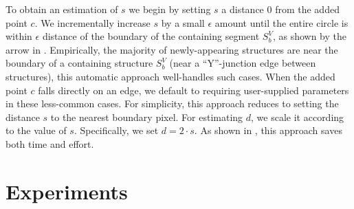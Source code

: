 \documentclass[]{spie}  %
\begin{document}
To obtain an estimation of $s$ we begin by setting $s$ a distance $0$
from the added point $c$.  We incrementally increase $s$ by a small
$\epsilon$ amount until the entire circle is within $\epsilon$
distance of the boundary of the containing segment $S^V_b$, as shown
by the arrow in .  Empirically, the majority of
newly-appearing structures are near the boundary of a containing
structure $S^V_b$ (near a ``Y''-junction edge between structures),
this automatic approach well-handles such cases.  When the added point
$c$ falls directly on an edge, we default to requiring user-supplied
parameters in these less-common cases.  For simplicity, this approach
reduces to setting the distance $s$ to the nearest boundary pixel.
For estimating $d$, we scale it according to the value of $s$.
Specifically, we set $d = 2\cdot s$.  As shown in , this
approach saves both time and effort.


\section{Experiments}
\label{sec:ex}

\end{document}
